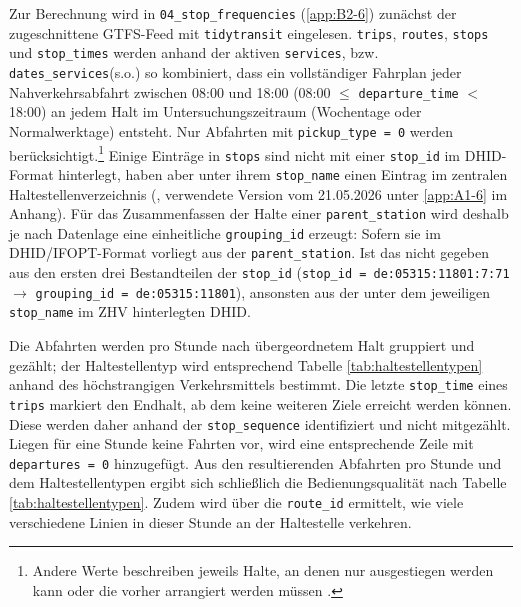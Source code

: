 \documentclass[11pt,pdftex,a4paper]{scrartcl}
\begin{document}
	Zur Berechnung wird in \texttt{04\_stop\_frequencies} (\ref{app:B2-6}) zunächst der zugeschnittene GTFS-Feed mit \texttt{tidytransit} eingelesen.
	\texttt{trips}, \texttt{routes}, \texttt{stops} und \texttt{stop\_times} werden anhand der aktiven \texttt{services}, bzw. \texttt{dates\_services}(s.o.) so kombiniert, dass ein vollständiger Fahrplan jeder Nahverkehrsabfahrt zwischen 08:00 und 18:00 (08:00 $\leq$ \texttt{departure\_time} $<$ 18:00) an jedem Halt im Untersuchungszeitraum (Wochentage oder Normalwerktage) entsteht. Nur Abfahrten mit \texttt{pickup\_type = 0} werden berücksichtigt.\footnote{Andere Werte beschreiben jeweils Halte, an denen nur ausgestiegen werden kann oder die vorher arrangiert werden müssen \parencite{mobilitydataGeneralTransitFeed2026}.} %
	Einige Einträge in \texttt{stops} sind nicht mit einer \texttt{stop\_id} im DHID-Format hinterlegt, haben aber unter ihrem \texttt{stop\_name} einen Eintrag im zentralen Haltestellenverzeichnis (\textcite{wviprof.dr.wermuthZhvwvigmbhde2026}, verwendete Version vom 21.05.2026 unter \ref{app:A1-6} im Anhang). Für das Zusammenfassen der Halte einer \texttt{parent\_station} wird deshalb je nach Datenlage eine einheitliche \texttt{grouping\_id} erzeugt: Sofern sie im DHID/IFOPT-Format vorliegt aus der \texttt{parent\_station}. Ist das nicht gegeben aus den ersten drei Bestandteilen der \texttt{stop\_id} (\texttt{stop\_id = de:05315:11801:7:71} $\rightarrow$ \texttt{grouping\_id = de:05315:11801}), ansonsten aus der unter dem jeweiligen \texttt{stop\_name} im ZHV hinterlegten DHID.
		
	Die Abfahrten werden pro Stunde nach übergeordnetem Halt gruppiert und gezählt; der Haltestellentyp wird entsprechend Tabelle \ref{tab:haltestellentypen} anhand des höchstrangigen Verkehrsmittels bestimmt. Die letzte \texttt{stop\_time} eines \texttt{trips} markiert den Endhalt, ab dem keine weiteren Ziele erreicht werden können. Diese werden daher anhand der \texttt{stop\_sequence} identifiziert und nicht mitgezählt. Liegen für eine Stunde keine Fahrten vor, wird eine entsprechende Zeile mit \texttt{departures = 0} hinzugefügt. Aus den resultierenden Abfahrten pro Stunde und dem Haltestellentypen ergibt sich schließlich die Bedienungsqualität nach Tabelle \ref{tab:haltestellentypen}. Zudem wird über die \texttt{route\_id} ermittelt, wie viele verschiedene Linien in dieser Stunde an der Haltestelle verkehren.
	
\end{document}
